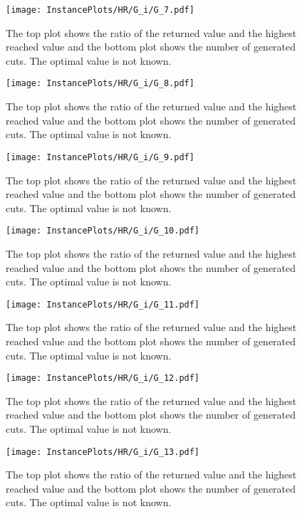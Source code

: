 \documentclass[10pt,a4paper]{article}
\begin{document}
\begin{figure}[H]
\texttt{[image: InstancePlots/HR/G\_i/G\_7.pdf]}
\caption{The top plot shows the ratio of the returned value and the highest reached value     and the bottom plot shows the number of generated cuts. The optimal value is not known.}
\end{figure}

\begin{figure}[H]
\texttt{[image: InstancePlots/HR/G\_i/G\_8.pdf]}
\caption{The top plot shows the ratio of the returned value and the highest reached value     and the bottom plot shows the number of generated cuts. The optimal value is not known.}
\end{figure}

\begin{figure}[H]
\texttt{[image: InstancePlots/HR/G\_i/G\_9.pdf]}
\caption{The top plot shows the ratio of the returned value and the highest reached value     and the bottom plot shows the number of generated cuts. The optimal value is not known.}
\end{figure}

\begin{figure}[H]
\texttt{[image: InstancePlots/HR/G\_i/G\_10.pdf]}
\caption{The top plot shows the ratio of the returned value and the highest reached value     and the bottom plot shows the number of generated cuts. The optimal value is not known.}
\end{figure}

\begin{figure}[H]
\texttt{[image: InstancePlots/HR/G\_i/G\_11.pdf]}
\caption{The top plot shows the ratio of the returned value and the highest reached value     and the bottom plot shows the number of generated cuts. The optimal value is not known.}
\end{figure}

\begin{figure}[H]
\texttt{[image: InstancePlots/HR/G\_i/G\_12.pdf]}
\caption{The top plot shows the ratio of the returned value and the highest reached value     and the bottom plot shows the number of generated cuts. The optimal value is not known.}
\end{figure}

\begin{figure}[H]
\texttt{[image: InstancePlots/HR/G\_i/G\_13.pdf]}
\caption{The top plot shows the ratio of the returned value and the highest reached value     and the bottom plot shows the number of generated cuts. The optimal value is not known.}
\end{figure}
\end{document}
